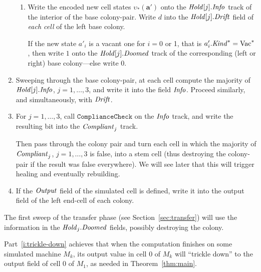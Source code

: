 \documentclass[11pt]{memoir}
\theoremstyle{definition} %
\renewcommand{\vek}[1]{\mathbf{#1}}
\newcommand{\fld}[1]{\ensuremath{\textit{#1\/}}}
\newcommand{\rul}[1]{\ensuremath{\texttt{#1}}}
\newcommand{\va}{\vek{a}} %
\newcommand{\Drift}{\fld{Drift}}
\newcommand{\Doomed}{\fld{Doomed}}
\newcommand{\Hold}{\fld{Hold}}
\newcommand{\Info}{\fld{Info}}
\newcommand{\Kind}{\fld{Kind}}
\newcommand{\Output}{\fld{Output}}
\newcommand{\Vacant}{\mathrm{Vac}}
\begin{document}
\begin{enumerate}
\begin{enumerate}
  \item\label{i:comp.write}
    Write the encoded new cell states \( \upsilon_{*}(\va') \) onto the
    \( \Hold[j].\Info \) track of the interior of the base colony-pair.
    Write \( d \) into the \( \Hold[j].\Drift \) field of \emph{each cell} of
    the left base colony.

    If the new state \( a'_{i} \) is a vacant one for \( i=0 \) or 1, that is
    \( a'_{i}.\Kind^{*}=\Vacant^{*} \),
    then write \( 1 \) onto the \( \Hold[j].\Doomed \) track of the corresponding (left or right)
    base colony---else write 0.
    
  \end{enumerate}

\item
  Sweeping through the base colony-pair,
  at each cell compute the majority of \( \Hold[j].\Info \), \( j=1,\dots,3 \),
  and write it into the field \( \Info \).
  Proceed similarly, and simultaneously, with \( \Drift \).
  
\item For \( j=1,\dots,3 \), call \( \rul{ComplianceCheck} \) on the \( \Info \) track, and
  write the resulting bit into the \( \fld{Compliant}_{j} \) track.
  
  Then pass through the colony pair and turn each cell in which the majority 
  of \( \fld{Compliant}_{j} \), \( j=1,\dots,3 \) is false,
  into a stem cell (thus destroying the colony-pair if the result was false everywhere).
  We will see later that this will trigger healing and eventually rebuilding.  

\item\label{i:trickle-down} If the \( \Output \) field of the simulated cell is defined, write it
  into the output field of the left end-cell of each colony.
   
\end{enumerate}

The first sweep of the transfer phase (see Section~\ref{sec:transfer})
will use the information in the \( \Hold_{j}.\Doomed \) fields,
possibly destroying the colony.

Part~\ref{i:trickle-down} achieves that when the computation finishes on some
simulated machine \( M_{k} \),
its output value in cell 0 of \( M_{k} \) will ``trickle down'' to the output field of  cell 0 of \( M_{1} \),
as needed in Theorem~\ref{thm:main}.
\end{document}
